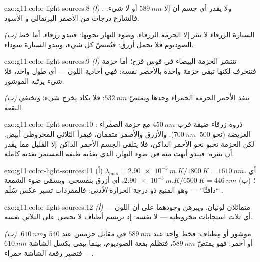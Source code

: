 \begin{solution}{exo:g11:color-light-sources:8}
\emph{(أ)} . ولا يقدر أي جسم أن  إلا
$\qty{589}{nm}$ أو لا شيء: فالشارع درجات من الأصفر البرتقالي و
الأسود.

\emph{(ب)} السيارة الزرقاء لا تنثر إلا الحزمة الزرقاء. وضوء النهار يحويها:
فتبدو زرقاء. أما خط الصوديوم فلا يحمل أزرق: فيُمتصّ كل شيء،
وتبدو السيارة سوداء.
\end{solution}

\begin{solution}{exo:g11:color-light-sources:9}
\emph{(أ)} تنتشر الحزمة البيضاء في قوس قزح؛ أما حزمة  فتنحرف
لكنها تبقى حزمة واحدة بالأخضر نفسه: فهي أحادية اللون
--- أي طول  واحد، فلا شيء يرتّبه الموشور.

\emph{(ب)} ينفذ  الأحمر الحزمة الحمراء وحدها ويمتصّ
$\qty{532}{nm}$: فلا يكاد يخرج شيء؛ وتختفي البقعة.
\end{solution}

\begin{solution}{exo:g11:color-light-sources:10}
: ذروة زرقاء ضيقة قرب $\qty{450}{nm}$ مع حزمة 
الصفراء العريضة (نحو $500$--$\qty{700}{nm}$). والأزرق والأصفر
متممان، فيقرأ الثلاثي المخروطي أبيض. لكن الحزمة تخبو نحو
الأحمر الداكن، فلا يتلقى الجسم الأحمر الداكن إلا القليل مما يقدر أن ينثره: فيبدو
أبهت منه في ضوء النهار، الذي يغذّيه طيفه المستمر تغذية كاملة.
\end{solution}

\begin{solution}{exo:g11:color-light-sources:11}
(أ) $\lambda_{\max} = \qty{2.90e-3}{m.K}/\qty{1800}{K}
= \qty{1610}{nm}$، أي ؛
(ب) $\qty{2.90e-3}{m.K}/\qty{6500}{K} = \qty{446}{nm}$، أي أزرق بنفسجي.
ويسمّى ضوء الشمعة ``دافئًا'' --- وهو المنبع ذو درجة الحرارة
\emph{الأدنى}: فالمفردات تسير عكس سُلّم .
\end{solution}

\begin{solution}{exo:g11:color-light-sources:12}
\emph{(أ)} متماثلان لونيان. ويبرهن وجودهما على أن اللون 
--- أي ثلاث استجابات مخروطية --- لا  نفسه: إذ ترتسم
أطياف لا تحصى على الثلاثي نفسه.

\emph{(ب)} موشور أو مِطياف: فخط واحد عند $\qty{589}{nm}$ في مقابل
حزمتين عند $540$ و$\qty{610}{nm}$. أو  أحمر: فهو يمتصّ
$\qty{589}{nm}$، فتظلم بقعة الصوديوم، بينما يبقى بكسل الشاشة
$\qty{610}{nm}$ --- فتصير رقعة الشاشة حمراء.
\end{solution}

